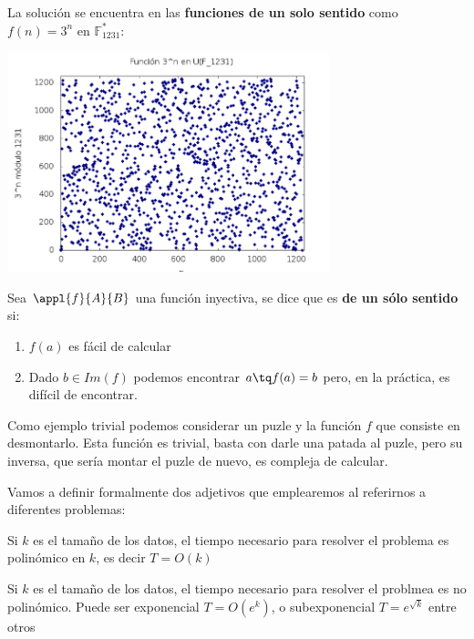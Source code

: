 La solución se encuentra en las \textbf{funciones de un solo sentido} como $f(n)=3^{n}$ en $\mathbb{F}_{1231}^*$:
\begin{center}
\includegraphics[width=0.7\textwidth]{img/3nF1231.png}
\end{center}

\newpage

\begin{defn}
Sea $\appl{f}{A}{B}$ una función inyectiva, se dice que es \textbf{de un sólo sentido} si:
\begin{enumerate}
\item $f(a)$ es fácil de calcular
\item Dado $b \in Im(f)$ podemos encontrar $a\tq f(a) = b$ pero, en la práctica, es difícil de encontrar.
\end{enumerate}
\end{defn}

Como ejemplo trivial podemos considerar un puzle y la función $f$ que consiste en desmontarlo. Esta función es trivial, basta con darle una patada al puzle, pero su inversa, que sería montar el puzle de nuevo, es compleja de calcular.

Vamos a definir formalmente dos adjetivos que emplearemos al referirnos a diferentes problemas:

\begin{defn}[Fácil]
Si $k$ es el tamaño de los datos, el tiempo necesario para resolver el problema es polinómico en $k$, es decir $T=O(k)$
\end{defn}

\begin{defn}[Difícil]
Si $k$ es el tamaño de los datos, el tiempo necesario para resolver el problmea es no polinómico. Puede ser exponencial $T=O(e^k)$, o subexponencial $T=e^{\sqrt{k}}$ entre otros
\end{defn}

